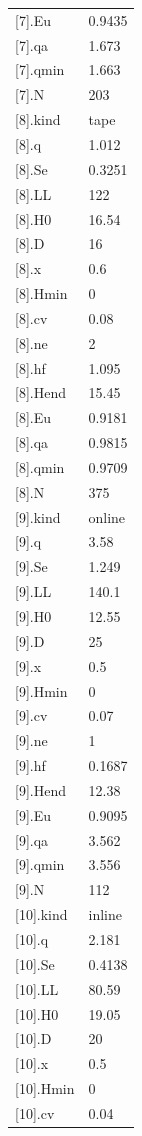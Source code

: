{\begin{longtable}{p{}p{}}
{}[7].Eu & 0.9435\\
{}[7].qa & 1.673\\
{}[7].qmin & 1.663\\
{}[7].N & 203\\
{}[8].kind & tape\\
{}[8].q & 1.012\\
{}[8].Se & 0.3251\\
{}[8].LL & 122\\
{}[8].H0 & 16.54\\
{}[8].D & 16\\
{}[8].x & 0.6\\
{}[8].Hmin & 0\\
{}[8].cv & 0.08\\
{}[8].ne & 2\\
{}[8].hf & 1.095\\
{}[8].Hend & 15.45\\
{}[8].Eu & 0.9181\\
{}[8].qa & 0.9815\\
{}[8].qmin & 0.9709\\
{}[8].N & 375\\
{}[9].kind & online\\
{}[9].q & 3.58\\
{}[9].Se & 1.249\\
{}[9].LL & 140.1\\
{}[9].H0 & 12.55\\
{}[9].D & 25\\
{}[9].x & 0.5\\
{}[9].Hmin & 0\\
{}[9].cv & 0.07\\
{}[9].ne & 1\\
{}[9].hf & 0.1687\\
{}[9].Hend & 12.38\\
{}[9].Eu & 0.9095\\
{}[9].qa & 3.562\\
{}[9].qmin & 3.556\\
{}[9].N & 112\\
{}[10].kind & inline\\
{}[10].q & 2.181\\
{}[10].Se & 0.4138\\
{}[10].LL & 80.59\\
{}[10].H0 & 19.05\\
{}[10].D & 20\\
{}[10].x & 0.5\\
{}[10].Hmin & 0\\
{}[10].cv & 0.04\\

\end{longtable}}
